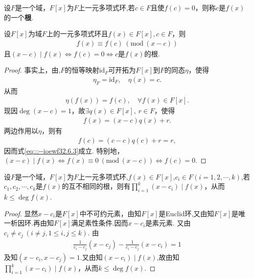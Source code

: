 \documentclass[../../main.tex]{subfiles}%
\begin{document}
\begin{definition}
设$F$是一个域，$F[x]$为$F$上一元多项式环,若$c \in F$且使$f(c) = 0$，则称$c$是$f(x)$的一个\textbf{根}.
\end{definition}

\begin{corollary}\label{corollary:抽象代数--推论2.6.2}
设$F[x]$为域$F$上的一元多项式环且$f(x) \in F[x],c \in F$，则
\begin{align}\label{eq:::--ioewf32.6.3}
f(x) \equiv f(c)\ (\mathrm{mod}\ (x - c))
\end{align}
且$(x - c) \mid f(x)\iff f(c) = 0\iff c\text{是}f(x)\text{的根}$.
\end{corollary}
\begin{proof}

事实上，由,$F$的恒等映射$\mathrm{id}_F$可开拓为$F[x]$到$F$的同态$\eta$，使得
\begin{align*}
\eta _F=\mathrm{id}_F,\quad \eta \left( x \right) =c.
\end{align*}
从而
\begin{align*}
\eta(f(x)) = f(c),\quad \forall f(x) \in F[x].
\end{align*}
现因$\deg(x - c) = 1$，故$\exists q(x) \in F[x],\ r \in F$，使得
\begin{align*}
f(x) = (x - c)q(x) + r.
\end{align*}
两边作用以$\eta$，则有
\begin{align*}
f(c) = (c - c)q(c) + r = r,
\end{align*}
因而式\eqref{eq:::--ioewf32.6.3}成立.
特别地，$(x - c) \mid f(x)\iff f(x) \equiv 0\ (\mathrm{mod}\ (x - c))\iff f(c) = 0$.

\end{proof}

\begin{corollary}\label{corollary:抽象代数--推论2.6.3}
设$F$是一个域，$F[x]$为$F$上一元多项式环,$f(x) \in F[x]$,$c_i \in F(i=1,2,\cdots,k)$,若$c_1, c_2, \cdots, c_k$是$f(x)$的互不相同的根，则有$\prod\limits_{i=1}^k (x - c_i) \mid f(x)$，从而$k \leqslant \deg f(x)$.
\end{corollary}
\begin{proof}

显然$x - c_i$是$F[x]$中不可约元素，由知$F[x]$是Euclid环,又由知$F[x]$是唯一析因环.再由知$F[x]$满足素性条件.因而$x - c_i$是素元素. 又由$c_i \neq c_j\ (i \neq j, 1 \leqslant i, j \leqslant k)$. 由
\begin{align*}
\frac{1}{c_i - c_j}(x - c_j) - \frac{1}{c_i - c_j}(x - c_i) = 1
\end{align*}
及知$(x - c_i, x - c_j) = 1$.又由知$(x-c_i)\mid f(x)$,故由知$\prod\limits_{i=1}^k (x - c_i) \mid f(x)$，从而$k \leqslant \deg f(x)$.

\end{proof}
\end{document}
